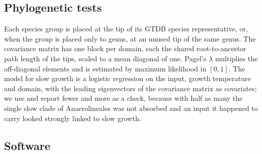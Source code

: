 \subsection{Phylogenetic tests}
Each species group is placed at the tip of its GTDB species representative, or, when the group is placed only to genus, at
an unused tip of the same genus. The covariance matrix has one block per domain, each the shared root-to-ancestor path
length of the tips, scaled to a mean diagonal of one. Pagel's $\lambda$ multiplies the off-diagonal elements and is
estimated by maximum likelihood in $[0,1]$. The model for slow growth is a logistic regression on the input, growth
temperature and domain, with the leading eigenvectors of the covariance matrix as covariates; we use \KEigen and report fewer and more
as a check, because with half as many the single slow clade of Anaerolineales was not absorbed and an input it happened to carry looked
strongly linked to slow growth.

\subsection{Software}

